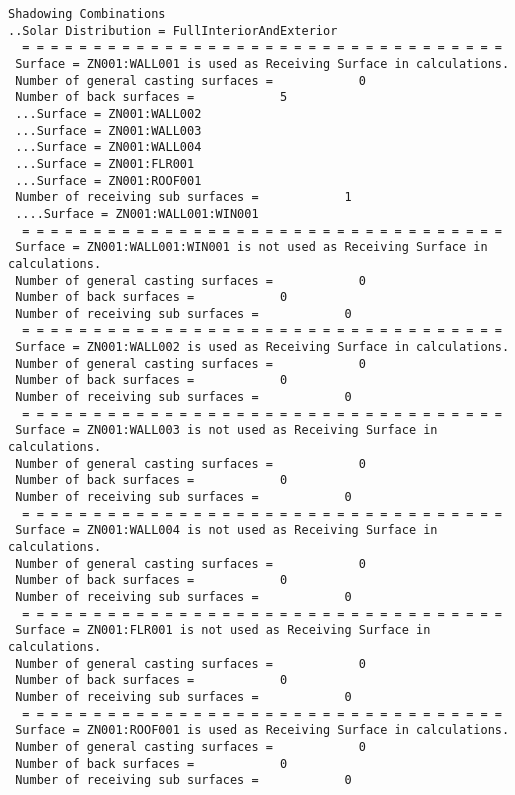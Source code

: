 \begin{lstlisting}
Shadowing Combinations
..Solar Distribution = FullInteriorAndExterior
  = = = = = = = = = = = = = = = = = = = = = = = = = = = = = = = = = =
 Surface = ZN001:WALL001 is used as Receiving Surface in calculations.
 Number of general casting surfaces =            0
 Number of back surfaces =            5
 ...Surface = ZN001:WALL002
 ...Surface = ZN001:WALL003
 ...Surface = ZN001:WALL004
 ...Surface = ZN001:FLR001
 ...Surface = ZN001:ROOF001
 Number of receiving sub surfaces =            1
 ....Surface = ZN001:WALL001:WIN001
  = = = = = = = = = = = = = = = = = = = = = = = = = = = = = = = = = =
 Surface = ZN001:WALL001:WIN001 is not used as Receiving Surface in calculations.
 Number of general casting surfaces =            0
 Number of back surfaces =            0
 Number of receiving sub surfaces =            0
  = = = = = = = = = = = = = = = = = = = = = = = = = = = = = = = = = =
 Surface = ZN001:WALL002 is used as Receiving Surface in calculations.
 Number of general casting surfaces =            0
 Number of back surfaces =            0
 Number of receiving sub surfaces =            0
  = = = = = = = = = = = = = = = = = = = = = = = = = = = = = = = = = =
 Surface = ZN001:WALL003 is not used as Receiving Surface in calculations.
 Number of general casting surfaces =            0
 Number of back surfaces =            0
 Number of receiving sub surfaces =            0
  = = = = = = = = = = = = = = = = = = = = = = = = = = = = = = = = = =
 Surface = ZN001:WALL004 is not used as Receiving Surface in calculations.
 Number of general casting surfaces =            0
 Number of back surfaces =            0
 Number of receiving sub surfaces =            0
  = = = = = = = = = = = = = = = = = = = = = = = = = = = = = = = = = =
 Surface = ZN001:FLR001 is not used as Receiving Surface in calculations.
 Number of general casting surfaces =            0
 Number of back surfaces =            0
 Number of receiving sub surfaces =            0
  = = = = = = = = = = = = = = = = = = = = = = = = = = = = = = = = = =
 Surface = ZN001:ROOF001 is used as Receiving Surface in calculations.
 Number of general casting surfaces =            0
 Number of back surfaces =            0
 Number of receiving sub surfaces =            0
\end{lstlisting}
